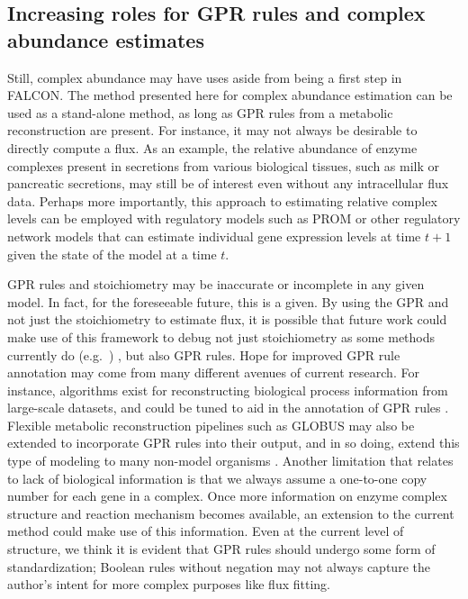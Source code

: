 \subsection{Increasing roles for GPR rules and complex abundance estimates}
Still, complex abundance may have uses aside from being a first
step in FALCON. The method presented here for complex abundance
estimation can be used as a stand-alone method, as long as GPR
rules from a metabolic reconstruction are present. For instance, it
may not always be desirable to directly compute a flux. As an example,
the relative abundance of enzyme complexes present in secretions
from various biological tissues, such as milk or pancreatic
secretions, may still be of interest even without any intracellular
flux data. Perhaps more importantly, this approach to estimating
relative complex levels can be employed with regulatory models such as
PROM \citep{Chandrasekaran2010a} or other regulatory network models
that can estimate individual gene expression levels at time $t+1$
given the state of the model at a time $t$.

GPR rules and stoichiometry may be inaccurate or
incomplete in any given model. In fact, for the foreseeable future,
this is a given. By using the GPR and not just the stoichiometry to
estimate flux, it is possible that future work could make use of this
framework to debug not just stoichiometry as some methods currently do
(e.g.\ \citealt{Reed14112006}) , but also GPR rules.  Hope for
improved GPR rule annotation may come from many different avenues of
current research. For instance, algorithms exist for reconstructing
biological process information from large-scale datasets, and could be
tuned to aid in the annotation of GPR rules \citep{Mitra2013}. 
Flexible metabolic reconstruction pipelines such as
GLOBUS may also be extended to incorporate GPR rules into their output, and
in so doing, extend this type of modeling to many non-model organisms
\citep{Plata2012}. Another limitation that relates to lack of
biological information is that we always assume a one-to-one copy
number for each gene in a complex. Once more information on enzyme
complex structure and reaction mechanism becomes available, an
extension to the current method could make use of this information.
Even at the current level of structure, we think it is evident
that GPR rules should undergo some form of standardization;
Boolean rules without negation may not always capture the author's
intent for more complex purposes like flux fitting.




